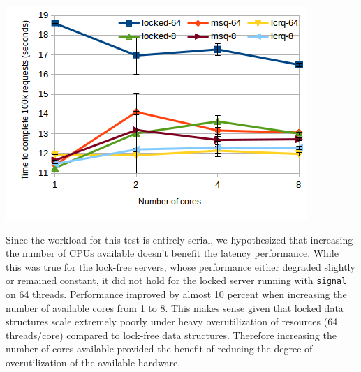 \documentclass[twoside,10pt]{article}
\newenvironment{Figure}
  {\par\medskip\noindent\minipage{\linewidth}}
  {\endminipage\par\medskip}
\begin{document}
\begin{multicols}{2}
\begin{Figure}
  \includegraphics[width=\linewidth]{img/latencyncores.png}
\end{Figure}

Since the workload for this test is entirely serial, we hypothesized
that increasing the number of CPUs available doesn't benefit the
latency performance. While this was true for the lock-free servers,
whose performance either degraded slightly or remained constant, it
did not hold for the locked server running with \verb+signal+ on 64
threads. Performance improved by almost 10 percent when increasing the
number of available cores from 1 to 8.  This makes sense given that
locked data structures scale extremely poorly under heavy
overutilization of resources (64 threads/core) compared to lock-free
data structures. Therefore increasing the number of cores available
provided the benefit of reducing the degree of overutilization of the
available hardware.


\end{multicols}
\end{document}
